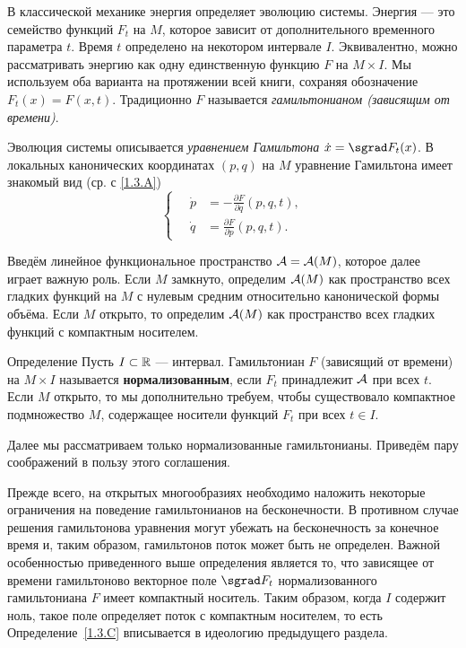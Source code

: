 В классической механике энергия определяет эволюцию системы.
Энергия — это семейство функций $F_t$ на $M$, которое зависит от
дополнительного временного параметра $t$.
Время $t$ определено на некотором интервале $I$.
Эквивалентно, можно рассматривать энергию как одну единственную функцию $F$ на $M \times I$.
Мы используем оба варианта на протяжении всей книги, сохраняя обозначение $F_t (x) = F (x, t)$.
Традиционно $F$ называется \emph{гамильтонианом (зависящим от
  времени)}.

{\sloppy

Эволюция системы описывается \emph{уравнением Гамильтона} $\dot x \z= \sgrad F_t (x)$.
В локальных канонических координатах $(p, q)$ на $M$ уравнение
Гамильтона имеет знакомый вид (ср. с \ref{1.3.A})
\[
\begin{cases}
\quad\dot p &= - \tfrac{\partial F}{\partial q} (p, q, t),\\
\quad\dot q &= \tfrac{\partial F}{\partial p} (p, q, t).
\end{cases}
\]

}

Введём линейное функциональное пространство \index[symb]{$\A$}$\mathcal{A}=\mathcal{A}(M)$, которое далее играет важную роль.
Если $M$ замкнуто, определим $\mathcal{A}(M)$ как пространство всех гладких функций на $M$ с нулевым средним относительно канонической формы объёма.
Если $M$ открыто, то определим $\mathcal{A}(M)$ как пространство всех гладких функций с компактным носителем.

\begin{ex}{Определение}\label{1.3.C}
Пусть $I \subset \mathbb{R}$ — интервал.
Гамильтониан $F$ (зависящий от времени) на $M \times I$ называется \textbf{нормализованным}, если $F_t$ принадлежит $\A$ при всех $t$.
Если $M$ открыто, то мы дополнительно требуем, чтобы существовало компактное подмножество $M$, содержащее носители функций $F_t$ при всех $t \in I$.
\end{ex}

Далее мы рассматриваем только нормализованные гамильтонианы.
Приведём пару соображений в пользу этого соглашения.

Прежде всего, на открытых многообразиях необходимо наложить некоторые ограничения на поведение гамильтонианов на бесконечности.
В противном случае решения гамильтонова уравнения могут
убежать на бесконечность за конечное время и, таким образом, гамильтонов поток может быть не определен.
Важной особенностью приведенного выше определения является то, что зависящее от времени гамильтоново векторное поле $\sgrad F_t$ нормализованного гамильтониана $F$ имеет компактный носитель.
Таким образом, когда $I$ содержит ноль, такое поле определяет поток с
компактным носителем, то есть Определение~\ref{1.3.C} вписывается в идеологию предыдущего раздела.


